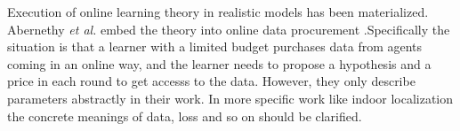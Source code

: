 \documentclass[10pt,conference,compsocconf,letterpaper]{IEEEtran}
\begin{document}
Execution of online learning theory in realistic models has been materialized. Abernethy \emph{et al.} embed the theory into online data procurement \cite{abernethy2015low}.Specifically the situation is that a learner with a limited budget purchases data from agents coming in an online way, and the learner needs to propose a hypothesis and a price in each round to get accesss to the data.
However, %
they only describe parameters abstractly in their work. In more specific work like indoor localization the concrete meanings of data, loss and so on should be clarified.
\end{document}
